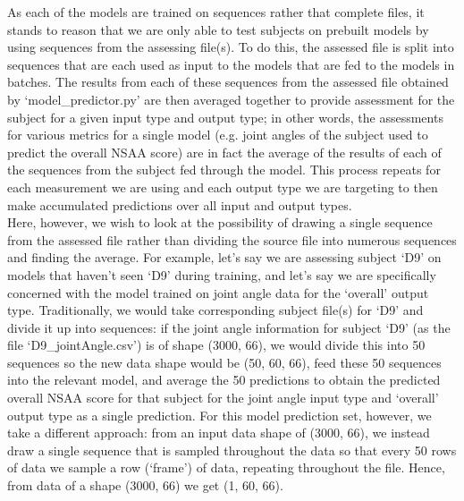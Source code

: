 \documentclass[12pt,twoside]{report}
\begin{document}
\quad As each of the models are trained on sequences rather that complete files, it stands to reason that we are only able to test subjects on prebuilt models by using sequences from the assessing file(s). To do this, the assessed file is split into sequences that are each used as input to the models that are fed to the models in batches. The results from each of these sequences from the assessed file obtained by ‘model\_predictor.py’ are then averaged together to provide assessment for the subject for a given input type and output type; in other words, the assessments for various metrics for a single model (e.g. joint angles of the subject used to predict the overall NSAA score) are in fact the average of the results of each of the sequences from the subject fed through the model. This process repeats for each measurement we are using and each output type we are targeting to then make accumulated predictions over all input and output types.\\

\quad Here, however, we wish to look at the possibility of drawing a single sequence from the assessed file rather than dividing the source file into numerous sequences and finding the average. For example, let’s say we are assessing subject ‘D9’ on models that haven’t seen ‘D9’ during training, and let’s say we are specifically concerned with the model trained on joint angle data for the ‘overall’ output type. Traditionally, we would take corresponding subject file(s) for ‘D9’ and divide it up into sequences: if the joint angle information for subject ‘D9’ (as the file ‘D9\_jointAngle.csv’) is of shape (3000, 66), we would divide this into 50 sequences so the new data shape would be (50, 60, 66), feed these 50 sequences into the relevant model, and average the 50 predictions to obtain the predicted overall NSAA score for that subject for the joint angle input type and ‘overall’ output type as a single prediction. For this model prediction set, however, we take a different approach: from an input data shape of (3000, 66), we instead draw a single sequence that is sampled throughout the data so that every 50 rows of data we sample a row (‘frame’) of data, repeating throughout the file. Hence, from data of a shape (3000, 66) we get (1, 60, 66).\\
\end{document}
